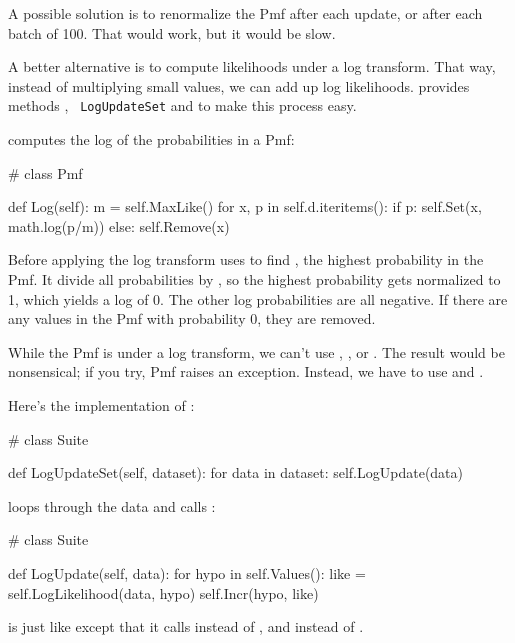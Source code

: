 \documentclass[12pt]{book}
\theoremstyle{exercise}
\begin{document}
A possible solution is to renormalize the Pmf after each update,
or after each batch of 100.  That would work, but it would be slow.

A better alternative is to compute likelihoods under a log
transform.  That way, instead of multiplying small values, we can add
up log likelihoods.   provides methods , {\tt
  LogUpdateSet} and  to make this process easy.

 computes the log of the probabilities in a Pmf:

\begin{code}
# class Pmf

    def Log(self):
        m = self.MaxLike()
        for x, p in self.d.iteritems():
            if p:
                self.Set(x, math.log(p/m))
            else:
                self.Remove(x)
\end{code}

Before applying the log transform  uses  to find
, the highest probability in the Pmf.  It divide all
probabilities by , so the highest probability gets normalized
to 1, which yields a log of 0.  The other log probabilities are all
negative.  If there are any values in the Pmf with probability 0, they
are removed.

While the Pmf is under a log transform, we can't use ,
, or .  The result would be nonsensical;
if you try, Pmf raises an exception.
Instead, we have to use 
and .  

Here's the implementation of :

\begin{code}
# class Suite

    def LogUpdateSet(self, dataset):
        for data in dataset:
            self.LogUpdate(data)
\end{code}

 loops through the data and calls :

\begin{code}
# class Suite

    def LogUpdate(self, data):
        for hypo in self.Values():
            like = self.LogLikelihood(data, hypo)
            self.Incr(hypo, like)
\end{code}

 is just like  except that it calls
 instead of , and 
instead of .
\end{document}
